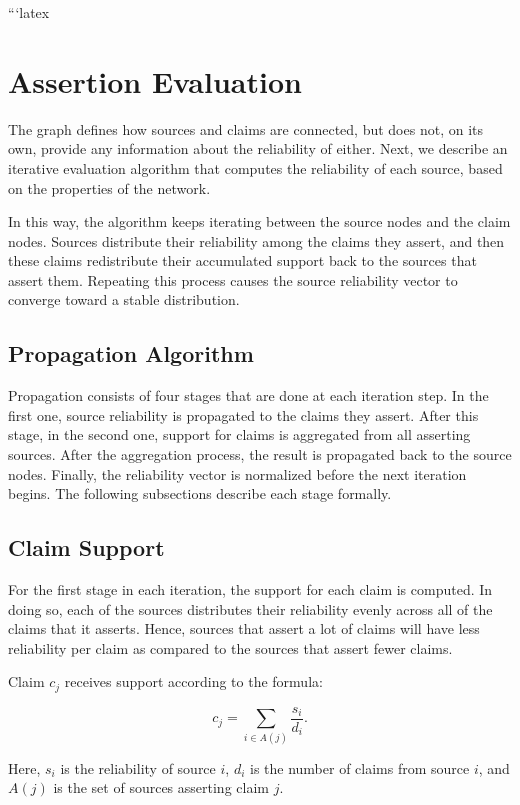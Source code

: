 ```latex
\section{Assertion Evaluation}

The graph defines how sources and claims are connected, but does not, on its own, provide any information about the reliability of either. Next, we describe an iterative evaluation algorithm that computes the reliability of each source, based on the properties of the network.

In this way, the algorithm keeps iterating between the source nodes and the claim nodes. Sources distribute their reliability among the claims they assert, and then these claims redistribute their accumulated support back to the sources that assert them. Repeating this process causes the source reliability vector to converge toward a stable distribution.

\subsection{Propagation Algorithm}

Propagation consists of four stages that are done at each iteration step. In the first one, source reliability is propagated to the claims they assert. After this stage, in the second one, support for claims is aggregated from all asserting sources. After the aggregation process, the result is propagated back to the source nodes. Finally, the reliability vector is normalized before the next iteration begins. The following subsections describe each stage formally.

\subsection{Claim Support}

For the first stage in each iteration, the support for each claim is computed. In doing so, each of the sources distributes their reliability evenly across all of the claims that it asserts. Hence, sources that assert a lot of claims will have less reliability per claim as compared to the sources that assert fewer claims.

Claim $c_j$ receives support according to the formula:

\[
c_j =
\sum_{i \in A(j)}
\frac{s_i}{d_i}.
\]

Here, $s_i$ is the reliability of source $i$, $d_i$ is the number of claims from source $i$, and $A(j)$ is the set of sources asserting claim $j$.


